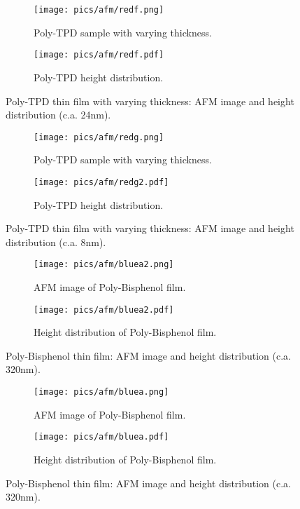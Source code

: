 \begin{figure}[!htb]
\centering
\begin{subfigure}[t]{.5\textwidth}
  \centering
  \texttt{[image: pics/afm/redf.png]}
  \caption{Poly-TPD sample with varying thickness.}
  \label{PolyTPD_VaryingThickness}
\end{subfigure}%
\begin{subfigure}[t]{.5\textwidth}
  \centering
  \texttt{[image: pics/afm/redf.pdf]}
  \caption{Poly-TPD height distribution.}
  \label{PolyTPD_HeightDistRedb}
\end{subfigure}
\caption{Poly-TPD thin film with varying thickness: AFM image and height distribution (c.a. 24nm).}
\end{figure}

\begin{figure}[!htb]
\centering
\begin{subfigure}[t]{.5\textwidth}
  \centering
  \texttt{[image: pics/afm/redg.png]}
  \caption{Poly-TPD sample with varying thickness.}
  \label{PolyTPD_VaryingThickness}
\end{subfigure}%
\begin{subfigure}[t]{.5\textwidth}
  \centering
  \texttt{[image: pics/afm/redg2.pdf]}
  \caption{Poly-TPD height distribution.}
  \label{PolyTPD_HeightDistRedb}
\end{subfigure}
\caption{Poly-TPD thin film with varying thickness: AFM image and height distribution (c.a. 8nm).}
\end{figure}

\begin{figure}[!htb]
\centering
\begin{subfigure}[t]{.5\textwidth}
  \centering
  \texttt{[image: pics/afm/bluea2.png]}
  \caption{AFM image of Poly-Bisphenol film.}
  \label{PolyBisphenol_AFM}
\end{subfigure}%
\begin{subfigure}[t]{.5\textwidth}
  \centering
  \texttt{[image: pics/afm/bluea2.pdf]}
  \caption{Height distribution of Poly-Bisphenol film.}
  \label{PolyBisphenol_HeightDist}
\end{subfigure}
\caption{Poly-Bisphenol thin film: AFM image and height distribution (c.a. 320nm).}
\end{figure}

\begin{figure}[!htb]
\centering
\begin{subfigure}[t]{.5\textwidth}
  \centering
  \texttt{[image: pics/afm/bluea.png]}
  \caption{AFM image of Poly-Bisphenol film.}
  \label{PolyBisphenol_AFM}
\end{subfigure}%
\begin{subfigure}[t]{.5\textwidth}
  \centering
  \texttt{[image: pics/afm/bluea.pdf]}
  \caption{Height distribution of Poly-Bisphenol film.}
  \label{PolyBisphenol_HeightDist}
\end{subfigure}
\caption{Poly-Bisphenol thin film: AFM image and height distribution (c.a. 320nm).}
\end{figure}

